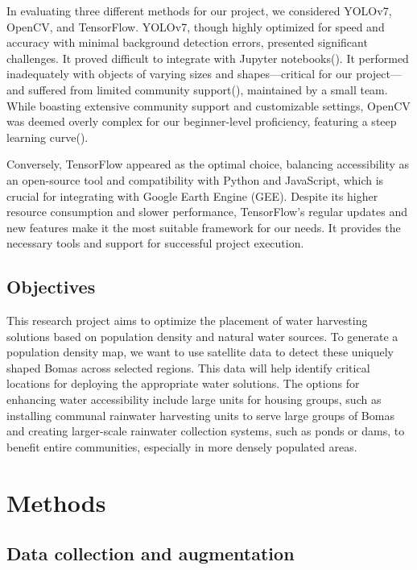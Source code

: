 \documentclass{article}
\begin{document}
In evaluating three different methods for our project, we considered YOLOv7, OpenCV, and TensorFlow. YOLOv7, though highly optimized for speed and accuracy with minimal background detection errors, presented significant challenges. It proved difficult to integrate with Jupyter notebooks(\autocite{s23135849}). It performed inadequately with objects of varying sizes and shapes—critical for our project—and suffered from limited community support(\autocite{IJERTV10IS060287}), maintained by a small team. While boasting extensive community support and customizable settings, OpenCV was deemed overly complex for our beginner-level proficiency, featuring a steep learning curve(\autocite{9174593}).

Conversely, TensorFlow appeared as the optimal choice, balancing accessibility as an open-source tool and compatibility with Python and JavaScript, which is crucial for integrating with Google Earth Engine (GEE).
Despite its higher resource consumption and slower performance, TensorFlow's regular updates and new features make it the most suitable framework for our needs. It provides the necessary tools and support for successful project execution.

\subsection{Objectives}

This research project aims to optimize the placement of water harvesting solutions based on population density and natural water sources. To generate a population density map, we want to use satellite data to detect these uniquely shaped Bomas across selected regions. This data will help identify critical locations for deploying the appropriate water solutions. The options for enhancing water accessibility include large units for housing groups, such as installing communal rainwater harvesting units to serve large groups of Bomas and creating larger-scale rainwater collection systems, such as ponds or dams, to benefit entire communities, especially in more densely populated areas.


\section{Methods}
\label{methods}

\subsection{Data collection and augmentation}
\label{data}
\end{document}
